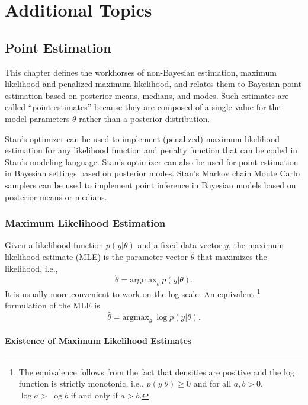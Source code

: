 \part{Additional Topics}


\chapter{Point Estimation}\label{mle.chapter}

\noindent
This chapter defines the workhorses of non-Bayesian estimation,
maximum likelihood and penalized maximum likelihood, and relates them
to Bayesian point estimation based on posterior means, medians, and
modes.  Such estimates are called ``point estimates'' because they
are composed of a single value for the model parameters $\theta$
rather than a posterior distribution.

Stan's optimizer can be used to implement (penalized) maximum
likelihood estimation for any likelihood function and penalty function
that can be coded in Stan's modeling language.  Stan's optimizer can
also be used for point estimation in Bayesian settings based on
posterior modes.  Stan's Markov chain Monte Carlo samplers can be used
to implement point inference in Bayesian models based on posterior
means or medians.

\section{Maximum Likelihood Estimation}\label{mle.section}

Given a likelihood function $p(y|\theta)$ and a fixed data vector $y$,
the maximum likelihood estimate (MLE) is the parameter vector $\hat{\theta}$
that maximizes the likelihood, i.e., 
\[
\hat{\theta} = \mbox{argmax}_{\theta} \ p(y|\theta).
\]
It is usually more convenient to work on the log scale.  
An equivalent%
%
\footnote{The equivalence follows from the fact that densities are
  positive and the log function is strictly monotonic, i.e., 
  $p(y|\theta) \geq 0$ and for all $a, b > 0$, $\log a > \log b$ if and
  only if $a > b$.}
%
formulation of the MLE is
%
\[
\hat{\theta} = \mbox{argmax}_{\theta} \ \log p(y|\theta).
\]

\subsection{Existence of Maximum Likelihood Estimates}


